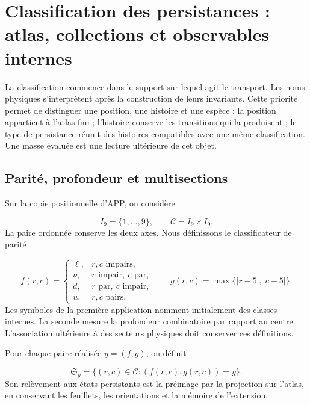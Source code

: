 \section{Classification des persistances : atlas, collections et observables internes
}
\label{vi:sec:atlas}

La classification commence dans le support sur lequel agit le transport.
Les noms physiques s’interprètent après la construction de leurs invariants.
Cette priorité permet de distinguer une position, une histoire et une espèce :
la position appartient à l’atlas fini ; l’histoire conserve les transitions
qui la produisent ; le type de persistance réunit des histoires compatibles avec une
même classification. Une masse évaluée est une lecture ultérieure de cet objet.


\subsection{Parité, profondeur et multisections
}

Sur la copie positionnelle d’APP, on considère

\[
 I_9=\{1,\ldots,9\},\qquad \mathcal C=I_9\times I_9.
\]
La paire ordonnée conserve les deux axes. Nous définissons le classificateur de parité

\[
 f(r,c)=
 \begin{cases}
 \ell,&r,c\text{ impairs},\\
 \nu,&r\text{ impair},\ c\text{ par},\\
 d,&r\text{ par},\ c\text{ impair},\\
 u,&r,c\text{ pairs},
 \end{cases}
 \qquad g(r,c)=\max\{|r-5|,|c-5|\}.
\]
Les symboles de la première application nomment initialement des classes internes.
La seconde mesure la profondeur combinatoire par rapport au centre. L’association
ultérieure à des secteurs physiques doit conserver ces définitions.




\begin{definition}
Pour chaque paire réalisée \(y=(f,g)\), on définit

\[
 \mathfrak S_y=\{(r,c)\in\mathcal C:(f(r,c),g(r,c))=y\}.
\]
Son relèvement aux états persistants est la préimage par la projection
sur l’atlas, en conservant les feuillets, les orientations et la mémoire de l’extension.

\end{definition}


